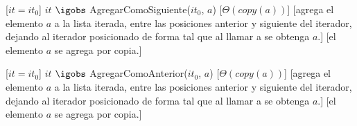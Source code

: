 \begin{Interfaz}
  [$it = it_0$]
  {$it$ $\igobs$ AgregarComoSiguiente($it_0$, $a$)}
  [$\Theta(copy(a))$]
  [agrega el elemento $a$ a la lista iterada, entre las posiciones anterior y siguiente del iterador, dejando al iterador posicionado de forma tal que al llamar a  se obtenga $a$.]
  [el elemento $a$ se agrega por copia.]


  [$it = it_0$]
  {$it$ $\igobs$ AgregarComoAnterior($it_0$, $a$)}
  [$\Theta(copy(a))$]
  [agrega el elemento $a$ a la lista iterada, entre las posiciones anterior y siguiente del iterador, dejando al iterador posicionado de forma tal que al llamar a  se obtenga $a$.]
  [el elemento $a$ se agrega por copia.]

\end{Interfaz}


